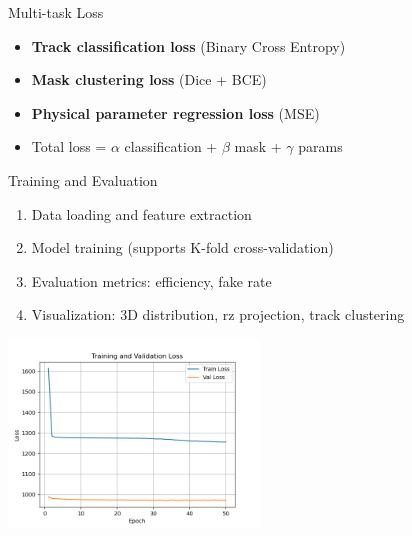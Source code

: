 \documentclass{beamer}
\begin{document}
\begin{frame}{Multi-task Loss}
  \begin{itemize}
    \item \textbf{Track classification loss} (Binary Cross Entropy)
    \item \textbf{Mask clustering loss} (Dice + BCE)
    \item \textbf{Physical parameter regression loss} (MSE)
    \item Total loss = $\alpha$ classification + $\beta$ mask + $\gamma$ params
  \end{itemize}
\end{frame}

\begin{frame}{Training and Evaluation}
  \begin{enumerate}
    \item Data loading and feature extraction
    \item Model training (supports K-fold cross-validation)
    \item Evaluation metrics: efficiency, fake rate
    \item Visualization: 3D distribution, rz projection, track clustering
  \end{enumerate}
  \begin{center}
    \includegraphics[width=0.5\textwidth]{../../checkpoints/loss_curve.png}
  \end{center}
\end{frame}
\end{document}
